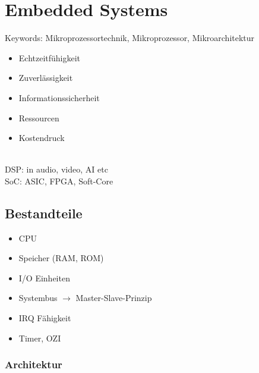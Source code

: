 \section{Embedded Systems}
Keywords: Mikroprozessortechnik, Mikroprozessor, Mikroarchitektur

\begin{itemize}[nosep]
	\item Echtzeitfühigkeit
	\item Zuverlässigkeit
	\item Informationssicherheit
	\item Ressourcen	
	\item Kostendruck	
\end{itemize}
~\\
DSP: in audio, video, AI etc
\\
SoC: ASIC, FPGA, Soft-Core

\subsection{Bestandteile}
\begin{itemize}[nosep]
	\item CPU
	\item Speicher (RAM, ROM)
	\item I/O Einheiten
	\item Systembus $\rightarrow$ Master-Slave-Prinzip
	\item IRQ Fähigkeit
	\item Timer, OZI
\end{itemize}

\subsubsection{Architektur}
